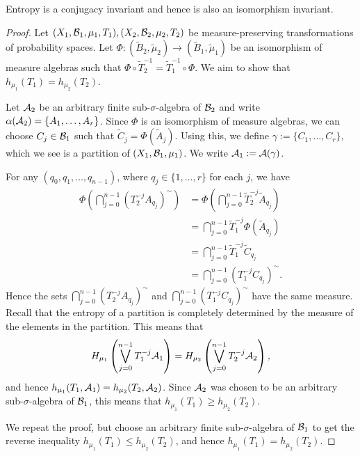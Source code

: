 \begin{theorem}
	Entropy is a conjugacy invariant and hence is also an isomorphism invariant.
	\begin{proof}
		Let $(X_1, \mathcal{B}_1, \mu_1, T_1), (X_2, \mathcal{B}_2, \mu_2, T_2)$ be measure-preserving transformations of probability spaces. Let $\Phi : (\tilde{B}_2, \tilde{\mu}_2) \to (\tilde{B}_1, \tilde{\mu}_1)$ be an isomorphism of measure algebras such that $\Phi \circ \tilde{T}_2^{-1} = \tilde{T}_1^{-1} \circ \Phi$. We aim to show that $h_{\mu_1}(T_1) = h_{\mu_2}(T_2)$.
		
		Let $\mathcal{A}_2$ be an arbitrary finite sub-$\sigma$-algebra of $\mathcal{B}_2$ and write $\alpha(\mathcal{A}_2) = \{A_1, \dots, A_r\}$. Since $\Phi$ is an isomorphism of measure algebras, we can choose $C_j \in \mathcal{B}_1$ such that $\tilde{C}_j = \Phi(\tilde{A}_j)$. Using this, we define $\gamma := \{C_1, \dots, C_r\}$, which we see is a partition of $(X_1, \mathcal{B}_1, \mu_1)$. We write $\mathcal{A}_1 := \mathcal{A}(\gamma)$.
		
		For any $(q_0, q_1, \dots, q_{n - 1})$, where $q_j \in \{1, \dots, r\}$ for each $j$, we have
		\begin{align*}
			\Phi\left(\bigcap_{j = 0}^{n - 1}{(T_2^{-j} A_{q_j})^\sim}\right) &= \Phi\left(\bigcap_{j = 0}^{n - 1}{\tilde{T}_2^{-j} \tilde{A}_{q_j}}\right) \\
				&= \bigcap_{j = 0}^{n - 1}{\tilde{T}_1^{-j} \Phi(\tilde{A}_{q_j})} \\
				&= \bigcap_{j = 0}^{n - 1}{\tilde{T}_1^{-j} \tilde{C}_{q_j}} \\
				&= \bigcap_{j = 0}^{n - 1}{(T_1^{-j} C_{q_j})^\sim}.
		\end{align*}
		Hence the sets $\bigcap_{j = 0}^{n - 1}{(T_2^{-j} A_{q_j})^\sim}$ and $\bigcap_{j = 0}^{n - 1}{(T_1^{-j} C_{q_j})^\sim}$ have the same measure. Recall that the entropy of a partition is completely determined by the measure of the elements in the partition. This means that
		\[
			H_{\mu_1}\left(\bigvee_{j = 0}^{n - 1}{T_1^{-j}{\mathcal{A}_1}}\right) = H_{\mu_2}\left(\bigvee_{j = 0}^{n - 1}{T_2^{-j}{\mathcal{A}_2}}\right),
		\]
		and hence $h_{\mu_1}(T_1, \mathcal{A}_1) = h_{\mu_2}(T_2, \mathcal{A}_2)$. Since $\mathcal{A}_2$ was chosen to be an arbitrary sub-$\sigma$-algebra of $\mathcal{B}_1$, this means that $h_{\mu_1}(T_1) \geq h_{\mu_2}(T_2)$.
		
		We repeat the proof, but choose an arbitrary finite sub-$\sigma$-algebra of $\mathcal{B}_1$ to get the reverse inequality $h_{\mu_1}(T_1) \leq h_{\mu_2}(T_2)$, and hence $h_{\mu_1}(T_1) = h_{\mu_2}(T_2)$.
	\end{proof}
\end{theorem}


